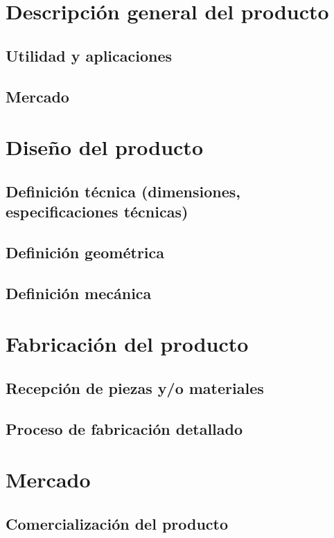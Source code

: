\section {Descripción general del producto}

	\subsection {Utilidad y aplicaciones}

	\subsection {Mercado}

\section {Diseño del producto}

	\subsection {Definición técnica (dimensiones, especificaciones técnicas)}

	\subsection {Definición geométrica}

	\subsection {Definición mecánica}

\section {Fabricación del producto}

	\subsection {Recepción de piezas y/o materiales}

	\subsection {Proceso de fabricación detallado}

\section {Mercado}

	\subsection {Comercialización del producto}

